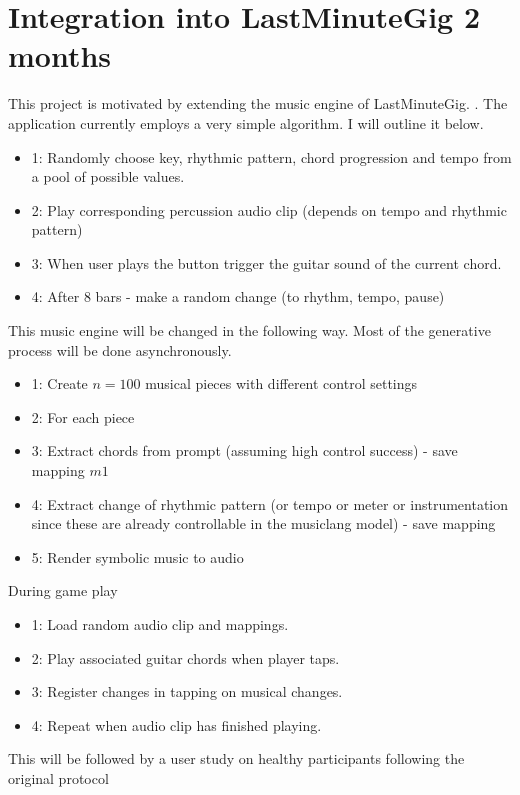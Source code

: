 \section{Integration into LastMinuteGig 2 months}
This project is motivated by extending the music engine of LastMinuteGig. \cite{Chalkiadakis_2022}. The application currently employs a very simple algorithm. I will outline it below. 
\begin{itemize}
    \item{1}: Randomly choose key, rhythmic pattern, chord progression and tempo from a pool of possible values.
    \item{2}: Play corresponding percussion audio clip (depends on tempo and rhythmic pattern)
    \item{3}: When user plays the button trigger the guitar sound of the current chord.
    \item{4}: After 8 bars - make a random change (to rhythm, tempo, pause)
\end{itemize}


This music engine will be changed in the following way. Most of the generative process will be done asynchronously.
\begin{itemize}
    \item{1}: Create $n=100$ musical pieces with different control settings
    \item{2}: For each piece
    \item{3}: Extract chords from prompt (assuming high control success) - save mapping $m1$
    \item{4}: Extract change of rhythmic pattern (or tempo or meter or instrumentation since these are already controllable in the musiclang model) - save mapping
    \item{5}: Render symbolic music to audio
\end{itemize}

During game play
\begin{itemize}
    \item{1}: Load random audio clip and mappings.
    \item{2}: Play associated guitar chords when player taps.
    \item{3}: Register changes in tapping on musical changes.
    \item{4}: Repeat when audio clip has finished playing.
\end{itemize}


This will be followed by a user study on healthy participants following the original protocol\cite{Chalkiadakis_2022}


